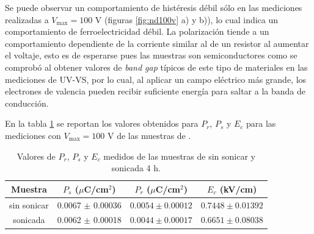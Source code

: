 \documentclass[../main.tex]{subfiles}
\begin{document}
Se puede observar un comportamiento de histéresis débil sólo en las mediciones realizadas a $V_\text{max}=100$ V (figuras \ref{fig:nd100v} a) y b)), lo cual indica un comportamiento de ferroelectricidad débil. La polarización tiende a un comportamiento dependiente de la corriente similar al de un resistor al aumentar el voltaje, esto es de esperarse pues las muestras son semiconductores como se comprobó al obtener valores de \textit{band gap} típicos de este tipo de materiales en las mediciones de UV-VS, por lo cual, al aplicar un campo eléctrico más grande, los electrones de valencia pueden recibir suficiente energía para saltar a la banda de conducción.

En la tabla \ref{tabla:respolarneod} se reportan los valores obtenidos para $P_r$, $P_s$ y $E_c$ para las mediciones con $V_\text{max}=100$ V de las muestras de \neod{}.

\begin{table}[H]
    \centering
    \begin{tabular}{|c||c|c|c|}
        \hline
        Muestra & $P_s$ ($\mu$C/cm$^2$) & $P_r$ ($\mu$C/cm$^2$) & $E_c$ (kV/cm) \\
        \hline\hline
        \neod{} sin sonicar & 0.0067 $\pm$ 0.00036 & $0.0054 \pm 0.00012$ & $0.7448 \pm 0.01392$ \\
        \hline
        \neod{} sonicada & 0.0062 $\pm$ 0.00018 & $0.0044 \pm 0.00017$ & $0.6651 \pm 0.08038$ \\
        \hline
        \end{tabular} 
    \caption{Valores de $P_r$, $P_s$ y $E_c$ medidos de las muestras de \neod{} sin sonicar y sonicada 4 h.}
    \label{tabla:respolarneod}
\end{table}
\subsection{\texorpdfstring{\sama{}}{SmFeO3}}
\end{document}

